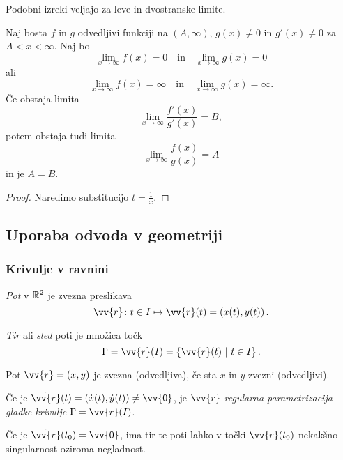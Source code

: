\documentclass[12pt, a4paper]{article}
\begin{document}
\begin{opomba}
Podobni izreki veljajo za leve in dvostranske limite.
\end{opomba}

\begin{trditev}
Naj bosta $f$ in $g$ odvedljivi funkciji na $(A,\infty)$, $g(x)\ne 0$ in $g'(x)\ne 0$  za $A<x<\infty$. Naj bo
\[
\lim_{x\to\infty}f(x)=0\quad\text{in}\quad\lim_{x\to\infty}g(x)=0
\]
ali
\[
\lim_{x\to\infty}f(x)=\infty\quad\text{in}\quad\lim_{x\to\infty}g(x)=\infty.
\]
Če obstaja limita
\[
\lim_{x\to\infty}\frac{f'(x)}{g'(x)}=B,
\]
potem obstaja tudi limita
\[
\lim_{x\to\infty}\frac{f(x)}{g(x)}=A
\]
in je $A=B$.
\end{trditev}

\begin{proof}
Naredimo substitucijo $t=\frac{1}{x}$.
\end{proof}

\newpage

\subsection{Uporaba odvoda v geometriji}

\subsubsection{Krivulje v ravnini}

\begin{definicija}
\emph{Pot} v $\mathbb{R}^2$ je zvezna preslikava
\[
\vv{r}\colon t\in I\mapsto\vv{r}(t)=\left(x(t),y(t)\right).
\]
\end{definicija}

\begin{definicija}
\emph{Tir}
 ali \emph{sled} poti je množica točk
\[
\Gamma=\vv{r}(I)=\setb{\vv{r}(t)}{t\in I}.
\]
\end{definicija}

\begin{definicija}
Pot $\vv{r}=(x,y)$ je zvezna (odvedljiva), če sta $x$ in $y$ zvezni (odvedljivi).
\end{definicija}

\begin{definicija}
Če je $\dot{\vv{r}}(t)=(\dot{x}(t),\dot{y}(t))\ne\vv{0}$, je $\vv{r}$ \emph{regularna parametrizacija gladke krivulje} $\Gamma=\vv{r}(I)$.
\end{definicija}

\begin{opomba}
Če je $\dot{\vv{r}}(t_0)=\vv{0}$, ima tir te poti lahko v točki $\vv{r}(t_0)$ nekakšno singularnost oziroma negladnost.
\end{opomba}
\end{document}
